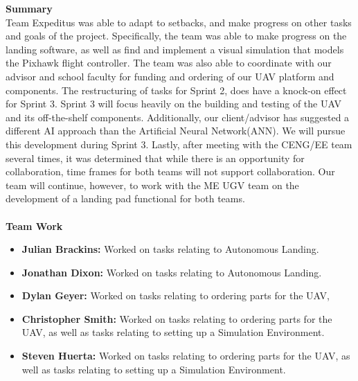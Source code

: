 \noindent \Large{\textbf{Summary}}\\
\normalsize Team Expeditus was able to adapt to setbacks, and make progress on other tasks and goals of the project. Specifically, the team was able to make progress on the landing software, as well as find and implement a visual simulation that models the Pixhawk flight controller. The team was also able to coordinate with our advisor and school faculty for funding and ordering of our UAV platform and components. The restructuring of tasks for Sprint 2, does have a knock-on effect for Sprint 3. Sprint 3 will focus heavily on the building and testing of the UAV and its off-the-shelf components. Additionally, our client/advisor has suggested a different AI approach than the Artificial Neural Network(ANN). We will pursue this development during Sprint 3. Lastly, after meeting with the CENG/EE team several times, it was determined that while there is an opportunity for collaboration, time frames for both teams will not support collaboration.  Our team will continue, however, to work with the ME UGV team on the development of a landing pad functional for both teams.\\
\vspace{5mm}
\\
\noindent \Large{\textbf{Team Work}}
\normalsize
\begin{itemize}
\item \textbf{Julian Brackins:} Worked on tasks relating to Autonomous Landing.
\item \textbf{Jonathan Dixon:} Worked on tasks relating to Autonomous Landing.
\item \textbf{Dylan Geyer:} Worked on tasks relating to ordering parts for the UAV,
\item \textbf{Christopher Smith:} Worked on tasks relating to ordering parts for the UAV, as well as tasks relating to setting up a Simulation Environment.
\item \textbf{Steven Huerta:} Worked on tasks relating to ordering parts for the UAV, as well as tasks relating to setting up a Simulation Environment.
\end{itemize}

